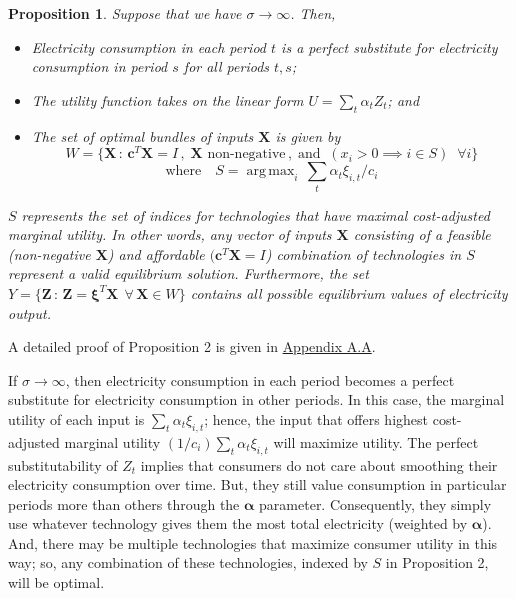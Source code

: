 \documentclass[11pt,a4paper,leqno]{extarticle}
\newtheorem{proposition}{Proposition}
\DeclareMathOperator*{\argmax}{arg\,max}
\begin{document}
	\begin{proposition}
		Suppose that we have $\sigma \to \infty$. Then, 
		\begin{itemize}
			\item Electricity consumption in each period $t$ is a perfect substitute for electricity consumption in period $s$ for all periods $t,s$; 
			\item The utility function takes on the linear form $U = \sum_t \alpha_t Z_t$; and
			\item The set of optimal bundles of inputs $\mathbf{X}$ is given by 
			$$
			W =
			\{ \mathbf{X} \, : \, \mathbf{c}^T \mathbf{X} = I \,,\;  \mathbf{X} \text{ non-negative} \,,\; \text{and} \;\;  (x_i > 0 \implies i \in S) \;\; \forall i \}
			$$
			$$\text{where} \quad S = \argmax_i \, \sum_t \alpha_t \xi_{i,t}/c_i$$
		\end{itemize}
		$S$ represents the set of indices for technologies that have maximal cost-adjusted marginal utility. In other words, any vector of inputs $\mathbf{X}$ consisting of a feasible (non-negative $\mathbf{X}$) and affordable $(\mathbf{c}^T \mathbf{X} = I$) combination of technologies in $S$ represent a valid equilibrium solution. Furthermore, the set $Y = \{ \mathbf{Z} \,: \, \mathbf{Z} = \boldsymbol{\xi}^T \mathbf{X}  \; \, \forall \, \mathbf{X} \in W \}$ contains all possible equilibrium values of electricity output. 
	\end{proposition}
	A detailed proof of Proposition 2 is given in \hyperref[sec:cobbdoug]{Appendix A.A}. 
		
	If $\sigma \to \infty$, then electricity consumption in each period becomes a perfect substitute for electricity consumption in other periods. In this case, the marginal utility of each input is $\sum_t \alpha_t \xi_{i,t}$; hence, the input that offers highest cost-adjusted marginal utility $(1/c_i) \sum_t \alpha_t \xi_{i,t}$ will maximize utility. The perfect substitutability of $Z_t$ implies that consumers do not care about smoothing their electricity consumption over time. But, they still value consumption in particular periods more than others through the $\boldsymbol{\alpha}$ parameter. Consequently, they simply use whatever technology gives them the most total electricity (weighted by $\boldsymbol{\alpha}$). And, there may be multiple technologies that maximize consumer utility in this way; so, any combination of these technologies, indexed by $S$ in Proposition 2, will be optimal. 
	
\end{document}
